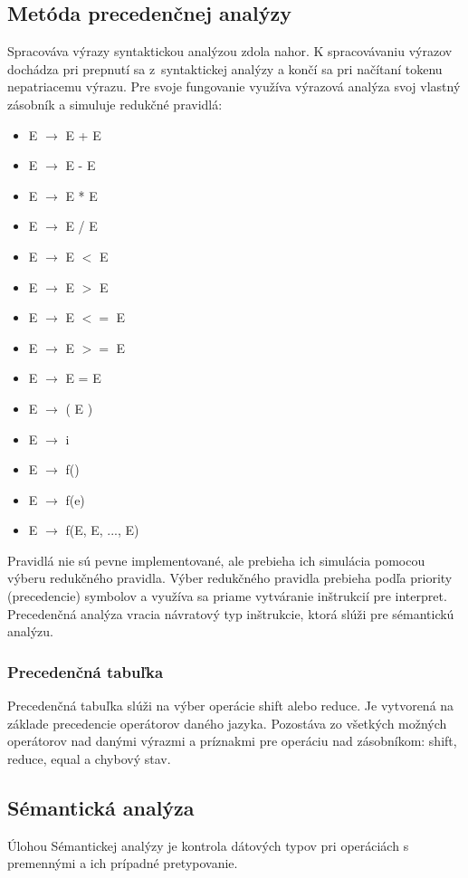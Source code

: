 \documentclass[a4paper]{article}
\begin{document}
\subsection{Metóda precedenčnej analýzy}
Spracováva výrazy syntaktickou analýzou zdola nahor. K spracovávaniu výrazov dochádza pri prepnutí sa z~syntaktickej analýzy a končí sa pri načítaní tokenu nepatriacemu výrazu. Pre svoje fungovanie využíva výrazová analýza svoj vlastný zásobník a simuluje redukčné pravidlá:
\begin{itemize}
\item{E $\rightarrow$ E + E}
\item{E $\rightarrow$ E - E}
\item{E $\rightarrow$ E * E}
\item{E $\rightarrow$ E / E}
\item{E $\rightarrow$ E $<$ E}
\item{E $\rightarrow$ E $>$ E}
\item{E $\rightarrow$ E $<=$ E}
\item{E $\rightarrow$ E $>=$ E}
\item{E $\rightarrow$ E = E}
\item{E $\rightarrow$ ( E )}
\item{E $\rightarrow$ i}
\item{E $\rightarrow$ f()}
\item{E $\rightarrow$ f(e)}
\item{E $\rightarrow$ f(E, E, ..., E)}
\end{itemize}
Pravidlá nie sú pevne implementované, ale prebieha ich simulácia pomocou výberu redukčného pravidla.
Výber redukčného pravidla prebieha podľa priority (precedencie) symbolov a využíva sa priame vytváranie inštrukcií pre interpret. Precedenčná analýza vracia návratový typ inštrukcie, ktorá slúži pre sémantickú analýzu.


\subsubsection{Precedenčná tabuľka}
Precedenčná tabuľka slúži na výber operácie shift alebo reduce. Je vytvorená na základe precedencie operátorov daného jazyka. Pozostáva zo všetkých možných operátorov nad danými výrazmi a príznakmi pre operáciu nad zásobníkom: shift, reduce, equal a chybový stav.

\subsection{Sémantická analýza}
Úlohou Sémantickej analýzy je kontrola dátových typov pri operáciách s premennými a ich prípadné pretypovanie.
\end{document}
